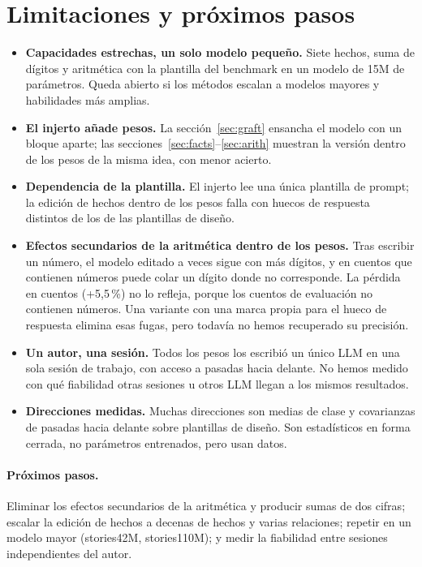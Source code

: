 \documentclass[11pt]{article}
\begin{document}
\section{Limitaciones y próximos pasos}
\begin{itemize}[leftmargin=*]
\item \textbf{Capacidades estrechas, un solo modelo pequeño.} Siete hechos, suma de dígitos y aritmética con la plantilla del benchmark en un modelo de 15M de parámetros. Queda abierto si los métodos escalan a modelos mayores y habilidades más amplias.
\item \textbf{El injerto añade pesos.} La sección~\ref{sec:graft} ensancha el modelo con un bloque aparte; las secciones~\ref{sec:facts}--\ref{sec:arith} muestran la versión dentro de los pesos de la misma idea, con menor acierto.
\item \textbf{Dependencia de la plantilla.} El injerto lee una única plantilla de prompt; la edición de hechos dentro de los pesos falla con huecos de respuesta distintos de los de las plantillas de diseño.
\item \textbf{Efectos secundarios de la aritmética dentro de los pesos.} Tras escribir un número, el modelo editado a veces sigue con más dígitos, y en cuentos que contienen números puede colar un dígito donde no corresponde. La pérdida en cuentos (+5,5\,\%) no lo refleja, porque los cuentos de evaluación no contienen números. Una variante con una marca propia para el hueco de respuesta elimina esas fugas, pero todavía no hemos recuperado su precisión.
\item \textbf{Un autor, una sesión.} Todos los pesos los escribió un único LLM en una sola sesión de trabajo, con acceso a pasadas hacia delante. No hemos medido con qué fiabilidad otras sesiones u otros LLM llegan a los mismos resultados.
\item \textbf{Direcciones medidas.} Muchas direcciones son medias de clase y covarianzas de pasadas hacia delante sobre plantillas de diseño. Son estadísticos en forma cerrada, no parámetros entrenados, pero usan datos.
\end{itemize}
\paragraph{Próximos pasos.} Eliminar los efectos secundarios de la aritmética y producir sumas de dos cifras; escalar la edición de hechos a decenas de hechos y varias relaciones; repetir en un modelo mayor (stories42M, stories110M); y medir la fiabilidad entre sesiones independientes del autor.
\end{document}
